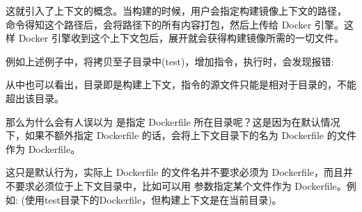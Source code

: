 \documentclass[letterpaper,10pt,english]{sphinxmanual}
\begin{document}
这就引入了上下文的概念。当构建的时候，用户会指定构建镜像上下文的路径， 命令得知这个路径后，会将路径下的所有内容打包，然后上传给 Docker 引擎。这样 Docker 引擎收到这个上下文包后，展开就会获得构建镜像所需的一切文件。

例如上述例子中，将拷贝至子目录中(test)，增加指令，执行时，会发现报错:

\begin{sphinxVerbatim}[commandchars=\\\{\}]
       
    
  
     
   
  
     
       
\end{sphinxVerbatim}

从中也可以看出，目录即是构建上下文，指令的源文件只能是相对于目录的，不能超出该目录。

那么为什么会有人误以为  是指定 Dockerfile 所在目录呢？这是因为在默认情况下，如果不额外指定 Dockerfile 的话，会将上下文目录下的名为 Dockerfile 的文件作为 Dockerfile。

这只是默认行为，实际上 Dockerfile 的文件名并不要求必须为 Dockerfile，而且并不要求必须位于上下文目录中，比如可以用   参数指定某个文件作为 Dockerfile。例如: (使用test目录下的Dockerfile，但构建上下文是在当前目录)。
\end{document}
